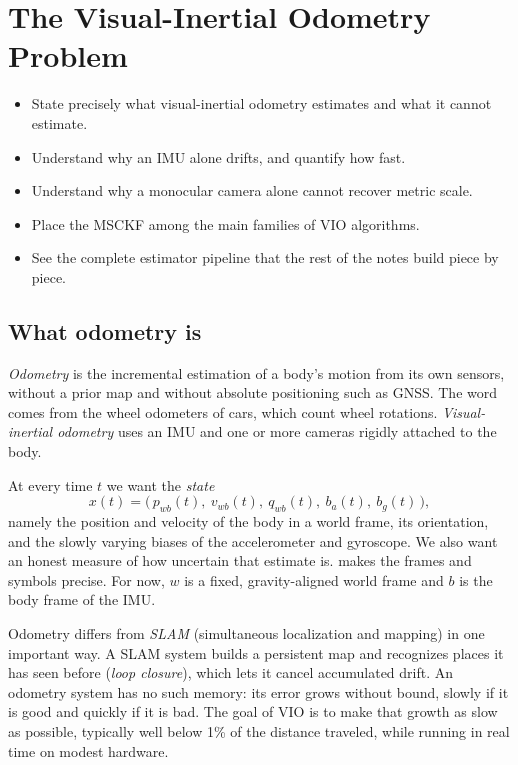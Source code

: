 \chapter{The Visual-Inertial Odometry Problem}
\label{ch:intro}

\begin{objectives}
\begin{itemize}
  \item State precisely what visual-inertial odometry estimates and what it cannot estimate.
  \item Understand why an IMU alone drifts, and quantify how fast.
  \item Understand why a monocular camera alone cannot recover metric scale.
  \item Place the MSCKF among the main families of VIO algorithms.
  \item See the complete estimator pipeline that the rest of the notes build piece by piece.
\end{itemize}
\end{objectives}

\section{What odometry is}

\emph{Odometry} is the incremental estimation of a body's motion from its own sensors, without a
prior map and without absolute positioning such as GNSS. The word comes from the wheel odometers of
cars, which count wheel rotations. \emph{Visual-inertial odometry} uses an IMU and one or more
cameras rigidly attached to the body.

At every time $t$ we want the \emph{state}
\begin{equation}
  x(t) = \big(\, p_{wb}(t),\ v_{wb}(t),\ q_{wb}(t),\ b_a(t),\ b_g(t) \,\big),
\end{equation}
namely the position and velocity of the body in a world frame, its orientation, and the slowly
varying biases of the accelerometer and gyroscope. We also want an honest measure of how
uncertain that estimate is.  makes the frames and symbols precise. For now, $w$
is a fixed, gravity-aligned world frame and $b$ is the body frame of the IMU.

Odometry differs from \emph{SLAM} (simultaneous localization and mapping) in one important way. A
SLAM system builds a persistent map and recognizes places it has seen before (\emph{loop closure}),
which lets it cancel accumulated drift. An odometry system has no such memory: its error grows
without bound, slowly if it is good and quickly if it is bad. The goal of VIO is to make that growth
as slow as possible, typically well below 1\% of the distance traveled, while running in real time
on modest hardware.

